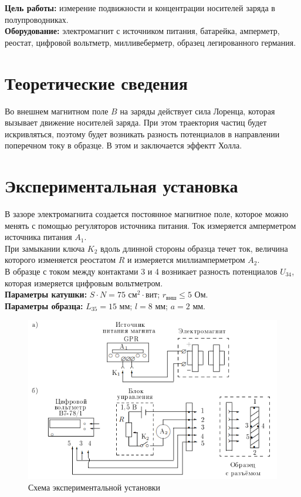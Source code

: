 \textbf{Цель работы:} измерение подвижности и концентрации носителей заряда
в полупроводниках.\\\indent
\textbf{Оборудование:} электромагнит с источником питания, батарейка, амперметр, реостат, цифровой вольтметр, милливеберметр, образец легированного германия.

\section*{Теоретические сведения}
\indent Во внешнем магнитном поле $B$ на заряды действует сила Лоренца, которая вызывает движение носителей заряда. При этом траектория частиц будет искривляться, поэтому будет возникать разность потенциалов в направлении поперечном току в образце. В этом и заключается эффектт Холла.
\section*{Экспериментальная установка}

\indent В зазоре электромагнита создается постоянное магнитное поле, которое можно менять с помощью регуляторов источника питания. 
Ток измеряется амперметром источника питания $A_1$.\\
\indent При замыкании ключа $K_2$ вдоль длинной стороны образца течет ток, величина которого изменяется реостатом $R$ и измеряется миллиамперметром $A_2$.\\
\indent В образце с током между контактами 3 и 4 возникает разность потенциалов $U_{34}$, которая измеряется цифровым вольтметром.\\

\indent \textbf{Параметры катушки:} $S\cdot N = 75$ см${^2\cdot \text{вит}}$; $r_{\text{внш}} \le 5$ Ом.\\
\indent \textbf{Параметры образца:} $L_{35} = 15$ мм; $l = 8$ мм; $a = 2$ мм.\\

\newpage
\begin{figure}[h!]
    \centering
    \includegraphics[width=12cm]{images/setup.png}
    \caption{Схема экспериментальной установки}
\end{figure}

